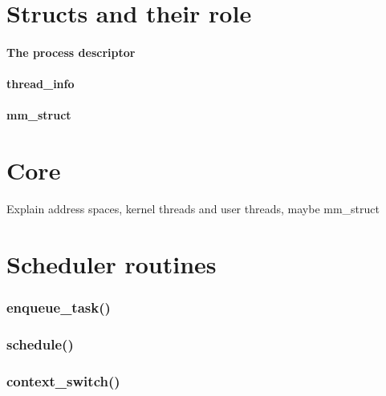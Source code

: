 \documentclass[10pt]{book}
\begin{document}
\section{Structs and their role}
\paragraph{The process descriptor}
\paragraph{thread\_info}
\paragraph{mm\_struct}
\section{Core} 
\label{sec:core}
Explain address spaces, kernel threads and user threads, maybe mm\_struct
\section{Scheduler routines} 
\subsubsection{enqueue\_task()}

\subsubsection{schedule()}

\subsubsection{context\_switch()}
\end{document}
